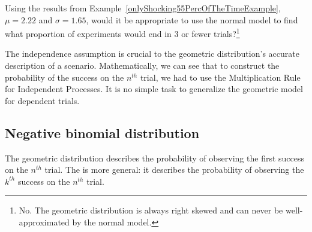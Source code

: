 \begin{exercise}
Using the results from Example~\ref{onlyShocking55PercOfTheTimeExample}, $\mu = 2.22$ and $\sigma = 1.65$, would it be appropriate to use the normal model to find what proportion of experiments would end in 3 or fewer trials?\footnote{No. The geometric distribution is always right skewed and can never be well-approximated by the normal model.}
\end{exercise}

The independence assumption is crucial to the geometric distribution's accurate description of a scenario. Mathematically, we can see that to construct the probability of the success on the $n^{th}$ trial, we had to use the Multiplication Rule for Independent Processes. It is no simple task to generalize the geometric model for dependent trials.


















\subsection{Negative binomial distribution}
\label{negativeBinomial}


The geometric distribution describes the probability of observing the first success on the $n^{th}$ trial. The  is more general: it describes the probability of observing the $k^{th}$ success on the $n^{th}$ trial.

